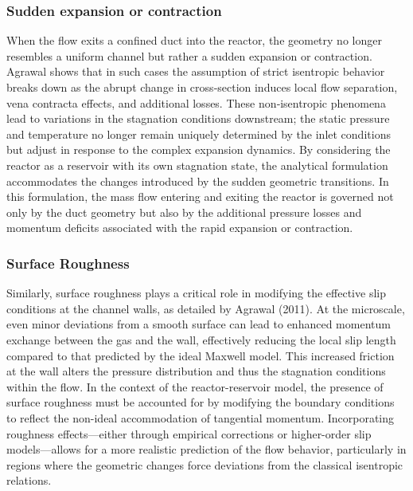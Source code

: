 
\subsubsection*{Sudden expansion or contraction}
	When the flow exits a confined duct into the reactor, the geometry no longer resembles a uniform channel but rather a sudden expansion or contraction.
	Agrawal shows that in such cases the assumption of strict isentropic behavior breaks down as the abrupt change in cross‐section induces local flow separation, vena contracta effects, and additional losses.
	These non‐isentropic phenomena lead to variations in the stagnation conditions downstream; the static pressure and temperature no longer remain uniquely determined by the inlet conditions but adjust in response to the complex expansion dynamics.
	By considering the reactor as a reservoir with its own stagnation state, the analytical formulation accommodates the changes introduced by the sudden geometric transitions.
	In this formulation, the mass flow entering and exiting the reactor is governed not only by the duct geometry but also by the additional pressure losses and momentum deficits associated with the rapid expansion or contraction.

\subsubsection*{Surface Roughness}
	Similarly, surface roughness plays a critical role in modifying the effective slip conditions at the channel walls, as detailed by Agrawal (2011).
	At the microscale, even minor deviations from a smooth surface can lead to enhanced momentum exchange between the gas and the wall, effectively reducing the local slip length compared to that predicted by the ideal Maxwell model.
	This increased friction at the wall alters the pressure distribution and thus the stagnation conditions within the flow.
	In the context of the reactor-reservoir model, the presence of surface roughness must be accounted for by modifying the boundary conditions to reflect the non-ideal accommodation of tangential momentum.
	Incorporating roughness effects—either through empirical corrections or higher-order slip models—allows for a more realistic prediction of the flow behavior, particularly in regions where the geometric changes force deviations from the classical isentropic relations.\cite{agrawal_comprehensive_2011, wang_analyses_2008}

